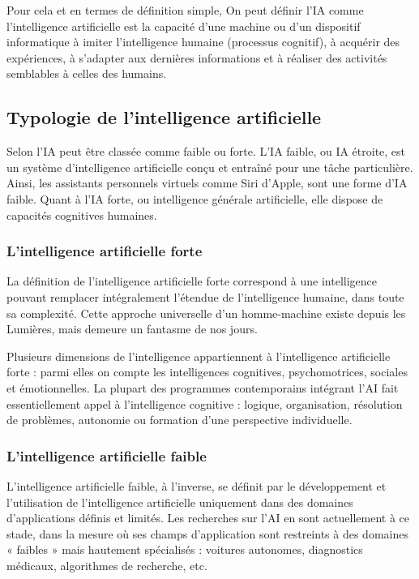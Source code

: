 Pour cela et en termes de définition simple, On peut définir l’IA comme l'intelligence artificielle est la capacité d'une machine ou d'un dispositif informatique à imiter l'intelligence humaine (processus cognitif), à acquérir des expériences, à s'adapter aux dernières informations et à réaliser des activités semblables à celles des humains\cite{klagesPatchBasedGenerative2019}.

\subsection{Typologie de l’intelligence artificielle}
Selon \cite{QuEstceQuea} l’IA peut être classée comme faible ou forte. L’IA faible, ou IA étroite, est un système d’intelligence artificielle conçu et entraîné pour une tâche particulière. Ainsi, les assistants personnels virtuels comme Siri d’Apple, sont une forme d’IA faible. Quant à l’IA forte, ou intelligence générale artificielle, elle dispose de capacités cognitives humaines.

\subsubsection{L’intelligence artificielle forte}
La définition de l’intelligence artificielle forte correspond à une intelligence pouvant remplacer intégralement l’étendue de l’intelligence humaine, dans toute sa complexité. Cette approche universelle d’un homme-machine existe depuis les Lumières, mais demeure un fantasme de nos jours.

Plusieurs dimensions de l’intelligence appartiennent à l’intelligence artificielle forte : parmi elles on compte les intelligences cognitives, psychomotrices, sociales et émotionnelles. La plupart des programmes contemporains intégrant l’AI fait essentiellement appel à l’intelligence cognitive : logique, organisation, résolution de problèmes, autonomie ou formation d’une perspective individuelle.

\subsubsection{L’intelligence artificielle faible}
L’intelligence artificielle faible, à l’inverse, se définit par le développement et l’utilisation de l’intelligence artificielle uniquement dans des domaines d’applications définis et limités. Les recherches sur l’AI en sont actuellement à ce stade, dans la mesure où ses champs d’application sont restreints à des domaines « faibles » mais hautement spécialisés : voitures autonomes, diagnostics médicaux, algorithmes de recherche, etc.

